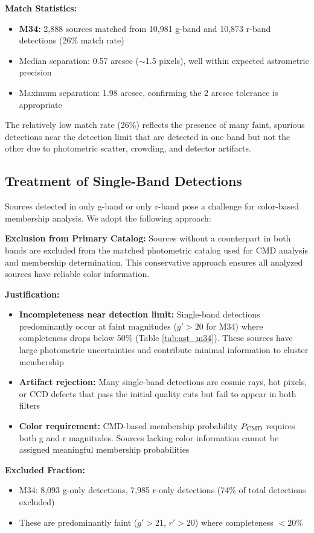 \documentclass[linenumbers,trackchanges,twocolumn]{aastex701}
\begin{document}
\textbf{Match Statistics:}
\begin{itemize}
\item \textbf{M34:} 2,888 sources matched from 10,981 g-band and 10,873 r-band detections (26\% match rate)
\item Median separation: 0.57 arcsec ($\sim$1.5 pixels), well within expected astrometric precision
\item Maximum separation: 1.98 arcsec, confirming the 2 arcsec tolerance is appropriate
\end{itemize}

The relatively low match rate (26\%) reflects the presence of many faint, spurious detections near the detection limit that are detected in one band but not the other due to photometric scatter, crowding, and detector artifacts.

\subsection{Treatment of Single-Band Detections}

Sources detected in only g-band or only r-band pose a challenge for color-based membership analysis. We adopt the following approach:

\textbf{Exclusion from Primary Catalog:} Sources without a counterpart in both bands are excluded from the matched photometric catalog used for CMD analysis and membership determination. This conservative approach ensures all analyzed sources have reliable color information.

\textbf{Justification:}
\begin{itemize}
\item \textbf{Incompleteness near detection limit:} Single-band detections predominantly occur at faint magnitudes ($g' > 20$ for M34) where completeness drops below 50\% (Table \ref{tab:ast_m34}). These sources have large photometric uncertainties and contribute minimal information to cluster membership
\item \textbf{Artifact rejection:} Many single-band detections are cosmic rays, hot pixels, or CCD defects that pass the initial quality cuts but fail to appear in both filters
\item \textbf{Color requirement:} CMD-based membership probability $P_{\rm CMD}$ requires both g and r magnitudes. Sources lacking color information cannot be assigned meaningful membership probabilities
\end{itemize}

\textbf{Excluded Fraction:}
\begin{itemize}
\item M34: 8,093 g-only detections, 7,985 r-only detections (74\% of total detections excluded)
\item These are predominantly faint ($g' > 21$, $r' > 20$) where completeness $< 20\%$
\end{itemize}
\end{document}
